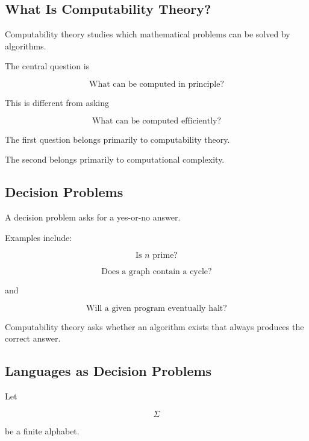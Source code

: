 \subsection{What Is Computability Theory?}
\label{subsec:what-is-computability-theory}

Computability theory studies which mathematical problems can be solved by
algorithms.

The central question is

\[
\boxed{
\text{What can be computed in principle?}
}
\]

This is different from asking

\[
\boxed{
\text{What can be computed efficiently?}
}
\]

The first question belongs primarily to computability theory.

The second belongs primarily to computational complexity.

\subsection{Decision Problems}
\label{subsec:computability-decision-problems}

A decision problem asks for a yes-or-no answer.

Examples include:

\[
\boxed{
\text{Is }n\text{ prime?}
}
\]

\[
\boxed{
\text{Does a graph contain a cycle?}
}
\]

and

\[
\boxed{
\text{Will a given program eventually halt?}
}
\]

Computability theory asks whether an algorithm exists that always produces
the correct answer.

\subsection{Languages as Decision Problems}
\label{subsec:languages-as-decision-problems}

Let

\[
\Sigma
\]

be a finite alphabet.

